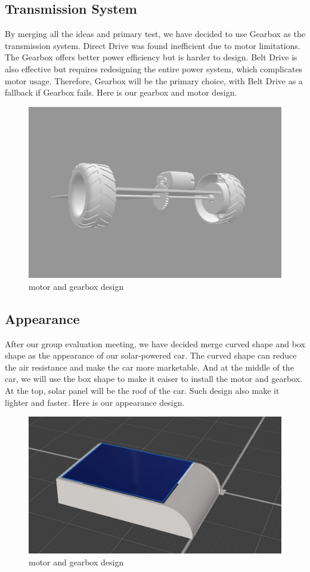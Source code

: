 \documentclass[12pt]{article}
\begin{document}
\subsection{Transmission System}
By merging all the ideas and primary test, we have decided to use Gearbox as the transmission system.
Direct Drive was found inefficient due to motor limitations.
The Gearbox offers better power efficiency but is harder to design. 
Belt Drive is also effective but requires redesigning the entire power system, 
which complicates motor usage. Therefore, Gearbox will be the primary choice, with Belt Drive as a fallback if Gearbox fails.
Here is our gearbox and motor design.
\begin{figure}[h] 
    \centering 
    \includegraphics[width=1\textwidth]{figure/gearbox_design.png} 
    \caption{motor and gearbox design} 
\end{figure}
\subsection{Appearance}
After our group evaluation meeting, we have decided merge curved shape and box shape as the appearance of our solar-powered car.
The curved shape can reduce the air resistance and make the car more marketable. And at the middle of the car, we will use the box shape to make 
it eaiser to install the motor and gearbox. At the top, solar panel will be the roof of the car. Such design also make it lighter and faster.
Here is our appearance design.
\begin{figure}[h] 
    \centering 
    \includegraphics[width=1\textwidth]{figure/appearence.png} 
    \caption{motor and gearbox design} 
\end{figure}
\end{document}

